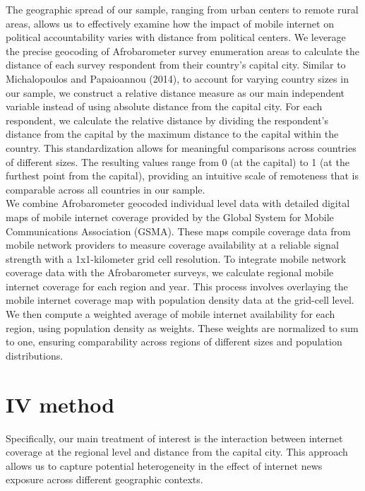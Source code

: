 \documentclass[11pt]{article}
\theoremstyle{plain}
\theoremstyle{plain}
\begin{document}
The geographic spread of our sample, ranging from urban centers to remote rural areas, allows us to effectively examine how the impact of mobile internet on political accountability varies with distance from political centers.
We leverage the precise geocoding of Afrobarometer survey enumeration areas to calculate the distance of each survey respondent from their country's capital city. Similar to Michalopoulos and Papaioannou (2014), to account for varying country sizes in our sample, we construct a relative distance measure as our main independent variable instead of using absolute distance from the capital city. For each respondent, we calculate the relative distance by dividing the respondent's distance from the capital by the maximum distance to the capital within the country.
This standardization allows for meaningful comparisons across countries of different sizes. The resulting values range from 0 (at the capital) to 1 (at the furthest point from the capital), providing an intuitive scale of remoteness that is comparable across all countries in our sample.\\

We combine Afrobarometer geocoded individual level data with detailed digital maps of mobile internet coverage provided by the Global System for Mobile Communications Association (GSMA). These maps compile coverage data from mobile network providers to measure coverage availability at a reliable signal strength with a 1x1-kilometer grid cell resolution.
To integrate mobile network coverage data with the Afrobarometer surveys, we calculate regional mobile internet coverage for each region and year. This process involves overlaying the mobile internet coverage map with population density data at the grid-cell level. We then compute a weighted average of mobile internet availability for each region, using population density as weights. These weights are normalized to sum to one, ensuring comparability across regions of different sizes and population distributions.

\section*{IV method}

Specifically, our main treatment of interest is the interaction between internet coverage at the regional level and distance from the capital city. This approach allows us to capture potential heterogeneity in the effect of internet news exposure across different geographic contexts.\\
\end{document}
